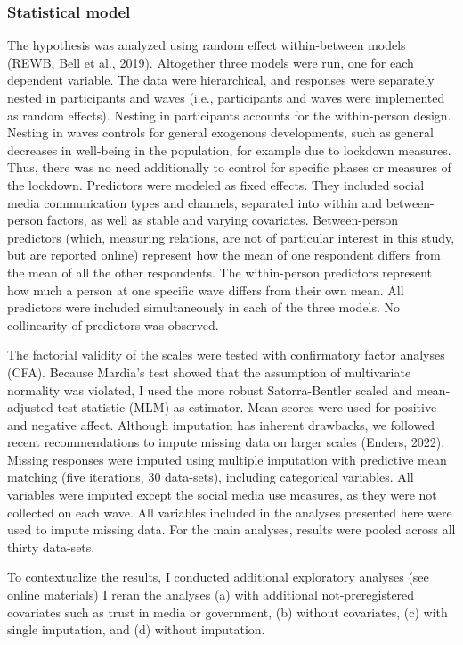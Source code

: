 \documentclass[
  man,mask,floatsintext]{apa7}
\begin{document}
\subsubsection{Statistical model}\label{statistical-model}

The hypothesis was analyzed using random effect within-between models (REWB, Bell et al., 2019).
Altogether three models were run, one for each dependent variable.
The data were hierarchical, and responses were separately nested in participants and waves (i.e., participants and waves were implemented as random effects).
Nesting in participants accounts for the within-person design.
Nesting in waves controls for general exogenous developments, such as general decreases in well-being in the population, for example due to lockdown measures.
Thus, there was no need additionally to control for specific phases or measures of the lockdown.
Predictors were modeled as fixed effects.
They included social media communication types and channels, separated into within and between-person factors, as well as stable and varying covariates.
Between-person predictors (which, measuring relations, are not of particular interest in this study, but are reported online) represent how the mean of one respondent differs from the mean of all the other respondents.
The within-person predictors represent how much a person at one specific wave differs from their own mean.
All predictors were included simultaneously in each of the three models.
No collinearity of predictors was observed.

The factorial validity of the scales were tested with confirmatory factor analyses (CFA).
Because Mardia's test showed that the assumption of multivariate normality was violated, I used the more robust Satorra-Bentler scaled and mean-adjusted test statistic (MLM) as estimator.
Mean scores were used for positive and negative affect.
Although imputation has inherent drawbacks, we followed recent recommendations to impute missing data on larger scales (Enders, 2022).
Missing responses were imputed using multiple imputation with predictive mean matching (five iterations, 30 data-sets), including categorical variables.
All variables were imputed except the social media use measures, as they were not collected on each wave.
All variables included in the analyses presented here were used to impute missing data.
For the main analyses, results were pooled across all thirty data-sets.

To contextualize the results, I conducted additional exploratory analyses (see online materials)
I reran the analyses (a) with additional not-preregistered covariates such as trust in media or government, (b) without covariates, (c) with single imputation, and (d) without imputation.
\end{document}
